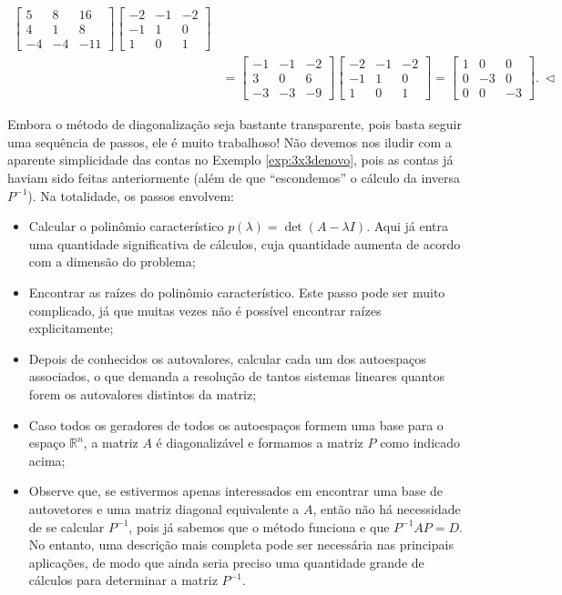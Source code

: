 \begin{ex}
\begin{align*}
\begin{bmatrix}
	5 & 8 & 16 \\
	4 & 1 & 8 \\
	-4 & -4 & -11
	\end{bmatrix}
	\begin{bmatrix}
	-2 & -1 & -2 \\
	-1 & 1 & 0 \\
	1 & 0 & 1
	\end{bmatrix} \\
	& =
	\begin{bmatrix}
	-1 &-1 & -2 \\
	3 & 0 & 6 \\
	-3 & -3 &-9
	\end{bmatrix}
	\begin{bmatrix}
	-2 & -1 & -2 \\
	-1 & 1 & 0 \\
	1 & 0 & 1
	\end{bmatrix} =
	\begin{bmatrix}
	1 & 0 & 0 \\
	0 & -3 & 0 \\
	0 & 0 & -3
	\end{bmatrix}. \ \lhd
          \end{align*}
\end{ex}

Embora o método de diagonalização seja bastante transparente, pois basta seguir uma sequência de passos, ele é muito trabalhoso! Não devemos nos iludir com a aparente simplicidade das contas no Exemplo \ref{exp:3x3denovo}, pois as contas já haviam sido feitas anteriormente (além de que ``escondemos'' o cálculo da inversa $P^{-1}$). Na totalidade, os passos envolvem:
\begin{itemize}
\item Calcular o polinômio característico $p(\lambda) = \det (A - \lambda I)$. Aqui já entra uma quantidade significativa de cálculos, cuja quantidade aumenta de acordo com a dimensão do problema;
\item Encontrar as raízes do polinômio característico. Este passo pode ser muito complicado, já que muitas vezes não é possível encontrar raízes explicitamente;
\item Depois de conhecidos os autovalores, calcular cada um dos autoespaços associados, o que demanda a resolução de tantos sistemas lineares quantos forem os autovalores distintos da matriz;
\item Caso todos os geradores de todos os autoespaços formem uma base para o espaço $\mathbb{R}^n$, a matriz $A$ é diagonalizável e formamos a matriz $P$ como indicado acima;
\item Observe que, se estivermos apenas interessados em encontrar uma base de autovetores e uma matriz diagonal equivalente a $A$, então não há necessidade de se calcular $P^{-1}$, pois já sabemos que o método funciona e que $P^{-1} AP = D$. No entanto, uma descrição mais completa pode ser necessária nas principais aplicações, de modo que ainda seria preciso uma quantidade grande de cálculos para determinar a matriz $P^{-1}$.
\end{itemize}

